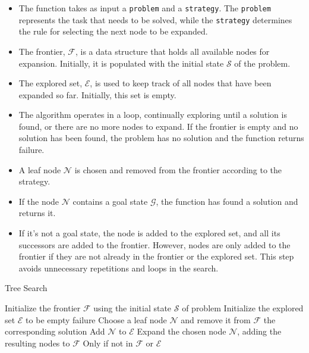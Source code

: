 \documentclass[a4paper,UKenglish,cleveref, autoref, thm-restate]{qlinhta}
\begin{document}
    \begin{itemize}
        \item The function takes as input a \texttt{problem} and a \texttt{strategy}. The \texttt{problem} represents the task that needs to be solved, while the \texttt{strategy} determines the rule for selecting the next node to be expanded.
        \item The frontier, $\mathcal{F}$, is a data structure that holds all available nodes for expansion. Initially, it is populated with the initial state $\mathcal{S}$ of the problem.
        \item The explored set, $\mathcal{E}$, is used to keep track of all nodes that have been expanded so far. Initially, this set is empty.
        \item The algorithm operates in a loop, continually exploring until a solution is found, or there are no more nodes to expand. If the frontier is empty and no solution has been found, the problem has no solution and the function returns failure.
        \item A leaf node $\mathcal{N}$ is chosen and removed from the frontier according to the strategy.
        \item If the node $\mathcal{N}$ contains a goal state $\mathcal{G}$, the function has found a solution and returns it.
        \item If it's not a goal state, the node is added to the explored set, and all its successors are added to the frontier. However, nodes are only added to the frontier if they are not already in the frontier or the explored set. This step avoids unnecessary repetitions and loops in the search.
    \end{itemize}
    \begin{algorithm}[H]
        \caption{Tree Search}\label{alg:tree_search}
        \begin{algorithmic}[1]
                \State Initialize the frontier $\mathcal{F}$ using the initial state $\mathcal{S}$ of problem
                \State Initialize the explored set $\mathcal{E}$ to be empty
                        \State \Return failure
                    \EndIf
                    \State Choose a leaf node $\mathcal{N}$ and remove it from $\mathcal{F}$
                        \State \Return the corresponding solution
                    \EndIf
                    \State Add $\mathcal{N}$ to $\mathcal{E}$
                    \State Expand the chosen node $\mathcal{N}$, adding the resulting nodes to $\mathcal{F}$
                    \State Only if not in $\mathcal{F}$ or $\mathcal{E}$
                \EndWhile
            \EndProcedure
        \end{algorithmic}
    \end{algorithm}
\end{document}
